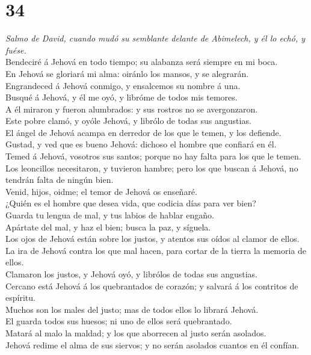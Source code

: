 \hypertarget{section-33}{%
\section{34}\label{section-33}}

 \emph{Salmo de David, cuando mudó su semblante delante de
Abimelech, y él lo echó, y fuése.}\\
Bendeciré á Jehová en todo tiempo; su alabanza será siempre en mi
boca.\\
 En Jehová se gloriará mi alma: oiránlo los mansos, y se
alegrarán.\\
 Engrandeced á Jehová conmigo, y ensalcemos su nombre á
una.\\
 Busqué á Jehová, y él me oyó, y libróme de todos mis
temores.\\
 A él miraron y fueron alumbrados: y sus rostros no se
avergonzaron.\\
 Este pobre clamó, y oyóle Jehová, y librólo de todas sus
angustias.\\
 El ángel de Jehová acampa en derredor de los que le temen,
y los defiende.\\
 Gustad, y ved que es bueno Jehová: dichoso el hombre que
confiará en él.\\
 Temed á Jehová, vosotros sus santos; porque no hay falta
para los que le temen.\\
 Los leoncillos necesitaron, y tuvieron hambre; pero los
que buscan á Jehová, no tendrán falta de ningún bien.\\
 Venid, hijos, oidme; el temor de Jehová os enseñaré.\\
 ¿Quién es el hombre que desea vida, que codicia días para
ver bien?\\
 Guarda tu lengua de mal, y tus labios de hablar engaño.\\
 Apártate del mal, y haz el bien; busca la paz, y
síguela.\\
 Los ojos de Jehová están sobre los justos, y atentos sus
oídos al clamor de ellos.\\
 La ira de Jehová contra los que mal hacen, para cortar de
la tierra la memoria de ellos.\\
 Clamaron los justos, y Jehová oyó, y librólos de todas sus
angustias.\\
 Cercano está Jehová á los quebrantados de corazón; y
salvará á los contritos de espíritu.\\
 Muchos son los males del justo; mas de todos ellos lo
librará Jehová.\\
 El guarda todos sus huesos; ni uno de ellos será
quebrantado.\\
 Matará al malo la maldad; y los que aborrecen al justo
serán asolados.\\
 Jehová redime el alma de sus siervos; y no serán asolados
cuantos en él confían.

